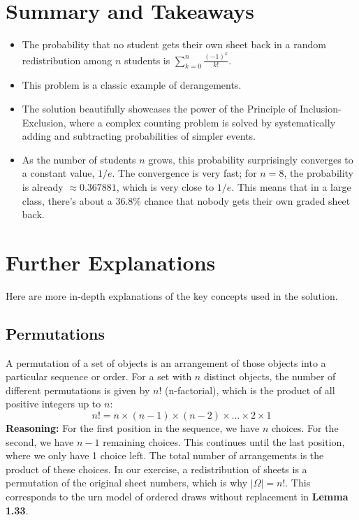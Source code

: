 \documentclass[11pt,a4paper]{article}
\begin{document}
\section{Summary and Takeaways}
\begin{itemize}
    \item The probability that no student gets their own sheet back in a random redistribution among $n$ students is $\sum_{k=0}^n \frac{(-1)^k}{k!}$.
    \item This problem is a classic example of derangements.
    \item The solution beautifully showcases the power of the Principle of Inclusion-Exclusion, where a complex counting problem is solved by systematically adding and subtracting probabilities of simpler events.
    \item As the number of students $n$ grows, this probability surprisingly converges to a constant value, $1/e$. The convergence is very fast; for $n=8$, the probability is already $\approx 0.367881$, which is very close to $1/e$. This means that in a large class, there's about a 36.8\% chance that nobody gets their own graded sheet back.
\end{itemize}

\newpage
\section{Further Explanations}

Here are more in-depth explanations of the key concepts used in the solution.

\subsection{Permutations \label{note:permutation}}
A permutation of a set of objects is an arrangement of those objects into a particular sequence or order. For a set with $n$ distinct objects, the number of different permutations is given by $n!$ (n-factorial), which is the product of all positive integers up to $n$:
\[ n! = n \times (n-1) \times (n-2) \times \dots \times 2 \times 1 \]
\textbf{Reasoning:} For the first position in the sequence, we have $n$ choices. For the second, we have $n-1$ remaining choices. This continues until the last position, where we only have 1 choice left. The total number of arrangements is the product of these choices. In our exercise, a redistribution of sheets is a permutation of the original sheet numbers, which is why $|\Omega| = n!$. This corresponds to the urn model of ordered draws without replacement in \textbf{Lemma 1.33}.
\end{document}
